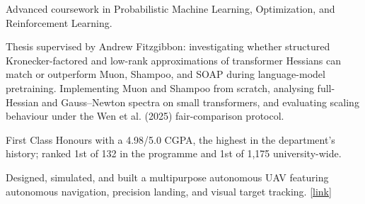 \begin{details}
    \item Advanced coursework in Probabilistic Machine Learning, Optimization, and Reinforcement Learning.
    \item Thesis supervised by Andrew Fitzgibbon: investigating whether structured Kronecker-factored and low-rank approximations of transformer Hessians can match or outperform Muon, Shampoo, and SOAP during language-model pretraining. Implementing Muon and Shampoo from scratch, analysing full-Hessian and Gauss--Newton spectra on small transformers, and evaluating scaling behaviour under the Wen et al. (2025) fair-comparison protocol.
\end{details}

\begin{details}
    \item First Class Honours with a 4.98/5.0 CGPA, the highest in the department's history; ranked 1st of 132 in the programme and 1st of 1{,}175 university-wide.
    \item Designed, simulated, and built a multipurpose autonomous UAV featuring autonomous navigation, precision landing, and visual target tracking. \href{https://www.nelsonelijah.com/projects/autouav}{[link]}
\end{details}
